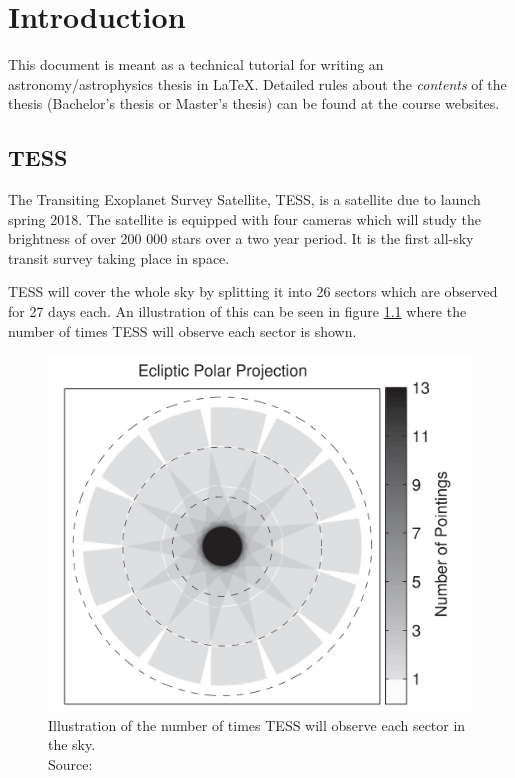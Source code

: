 \documentclass[12pt]{report}
\begin{document}
\chapter{Introduction}

This document is meant as a technical tutorial for writing an
astronomy/astrophysics thesis in LaTeX. Detailed rules about the {\it contents}
of the thesis (Bachelor's thesis or Master's thesis) can be found at the course
websites.

\section{TESS}
	The Transiting Exoplanet Survey Satellite, TESS, is a satellite due to launch spring 2018. The satellite is equipped with four cameras which will study the brightness of over 200 000 stars over a two year period. It is the first all-sky transit survey taking place in space.
	
	TESS will cover the whole sky by splitting it into 26 sectors which are observed for 27 days each. An illustration of this can be seen in figure \ref{fig:tess_time} where the number of times TESS will observe each sector is shown. 
	\begin{figure}[h!]
	\centering
		\includegraphics[scale=0.2]{img/tess_observe_time.png}
		\caption{Illustration of the number of times TESS will observe each sector in the sky.\\ \small{Source: \cite{2015ApJ...809...77S}}}
		\label{fig:tess_time}
	\end{figure}
\end{document}
